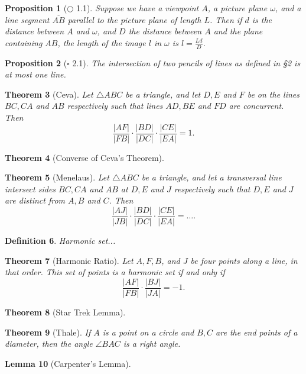 \documentclass[12pt]{amsart}
\newtheorem{theorem}{Theorem}
\newtheorem{lemma}[theorem]{Lemma}
\newtheorem{proposition}[theorem]{Proposition}
\newtheorem{definition}[theorem]{Definition}
\theoremstyle{remark}
\newtheorem*{basic notion}{Basic Notion}
\newcommand{\ol}[1]{\overline{#1}}
\theoremstyle{mycomment}
\begin{document}
\begin{proposition}[$\bigcirc$ 1.1] Suppose we have a viewpoint $A$, a picture plane $\omega$, and a line segment $\ol{AB}$ parallel to the picture plane of length $L$. Then if $d$ is the distance between $A$ and $\omega$, and $D$ the distance between $A$ and the plane containing $AB$, the length of the image $l$ in $\omega$ is $l=\frac{Ld}{D}$.
\end{proposition}
\begin{proposition}[$\square$ 2.1] The intersection of two pencils of lines as defined in \S 2 is at most one line.\end{proposition}
\begin{theorem}[Ceva] Let $\triangle ABC$ be a triangle, and let $D,E$ and $F$ be on the lines $BC, CA$ and $AB$ respectively such that lines $AD, BE$ and $FD$ are concurrent. Then $$\frac{|AF|}{|FB|}\cdot\frac{|BD|}{|DC|}\cdot\frac{|CE|}{|EA|}=1.$$
\end{theorem}
\begin{theorem}[Converse of Ceva's Theorem]
\end{theorem}
\begin{theorem}[Menelaus] Let $\triangle ABC$ be a triangle, and let a transversal line intersect sides $BC, CA$ and $AB$ at $D, E$ and $J$ respectively such that $D, E$ and $J$ are distinct from $A, B$ and $C$. Then $$\frac{|AJ|}{|JB|}\cdot\frac{|BD|}{|DC|}\cdot\frac{|CE|}{|EA|}=\ldots.$$
\end{theorem}
\begin{definition} Harmonic set...\end{definition}
\begin{theorem}[Harmonic Ratio] Let $A, F, B$, and $J$ be four points along a line, in that order. This set of points is a harmonic set if and only if $$\frac{|AF|}{|FB|}\cdot\frac{|BJ|}{|JA|}=-1.$$\end{theorem}
\begin{theorem}[Star Trek Lemma]
\end{theorem}
\begin{theorem}[Thale] If $A$ is a point on a circle and $B,C$ are the end points of a diameter, then the angle $\angle BAC$ is  a right angle.\end{theorem}
\begin{lemma}[Carpenter's Lemma]
\end{lemma}
 
\end{document}
